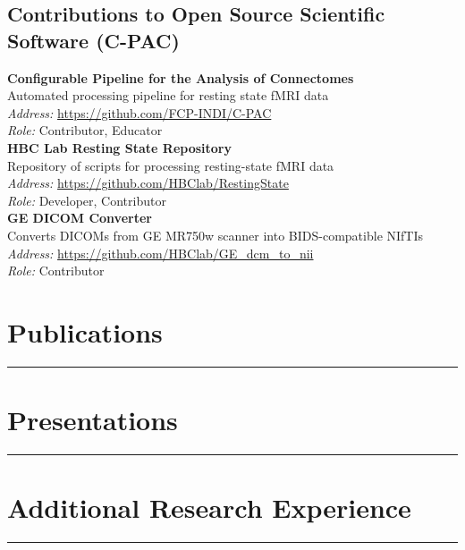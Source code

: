 \documentclass[11pt,letterpaper,sans]{moderncv}
\begin{document}
\subsection{Contributions to Open Source Scientific Software (C-PAC)}
\textbf{Configurable Pipeline for the Analysis of Connectomes} \\
Automated processing pipeline for resting state fMRI data\\
\emph{Address:} \href{https://github.com/FCP-INDI/C-PAC}{https://github.com/FCP-INDI/C-PAC}\\
\emph{Role:} Contributor, Educator\\

\textbf{HBC Lab Resting State Repository} \\
Repository of scripts for processing resting-state fMRI data\\
\emph{Address:} \href{https://github.com/HBClab/RestingState}{https://github.com/HBClab/RestingState}\\
\emph{Role:} Developer, Contributor\\

\textbf{GE DICOM Converter} \\
Converts DICOMs from GE MR750w scanner into BIDS-compatible NIfTIs\\
\emph{Address:} \href{https://github.com/HBClab/GE_dcm_to_nii}{https://github.com/HBClab/GE\_dcm\_to\_nii}\\
\emph{Role:} Contributor



\bigskip{}
\section{Publications} \smallskip \hrule \medskip
{}

\bigskip{}
\section{Presentations} \smallskip \hrule \medskip
{}


\bigskip{}
\section{Additional Research Experience} \smallskip \hrule \medskip
\end{document}
